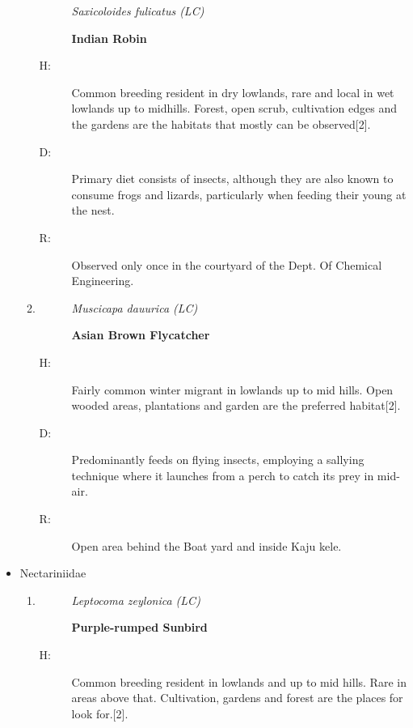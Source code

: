 \begin{itemize}
\begin{enumerate}
\begin{description}%
\item[]%
\textit{Saxicoloides fulicatus (LC)}%
\item[]%
\textbf{Indian Robin}%
\end{description}%
\begin{description}%
\item[H: ]%
Common breeding resident in dry lowlands, rare and local in wet lowlands up to midhills. Forest, open scrub, cultivation edges and the gardens are the habitats that mostly can be observed{[}2{]}.%
\item[D: ]%
Primary diet consists of insects, although they are also known to consume frogs and lizards, particularly when feeding their young at the nest.%
\item[R: ]%
Observed only once in the courtyard of the Dept. Of Chemical Engineering.%
\end{description}%
\item%
\begin{description}%
\item[]%
\textit{Muscicapa dauurica (LC)}%
\item[]%
\textbf{Asian Brown Flycatcher}%
\end{description}%
\begin{description}%
\item[H: ]%
Fairly common winter migrant in lowlands up to mid hills. Open wooded areas, plantations and garden are the preferred habitat{[}2{]}.%
\item[D: ]%
Predominantly feeds on flying insects, employing a sallying technique where it launches from a perch to catch its prey in mid{-}air.%
\item[R: ]%
Open area behind the Boat yard and inside Kaju kele.%
\end{description}%
\end{enumerate}%
\item%
Nectariniidae%
\begin{enumerate}%
\item%
\begin{description}%
\item[]%
\textit{Leptocoma zeylonica (LC)}%
\item[]%
\textbf{Purple{-}rumped Sunbird}%
\end{description}%
\begin{description}%
\item[H: ]%
Common breeding resident in lowlands and up to mid hills. Rare in areas above that. Cultivation, gardens and forest are the places for look for.{[}2{]}.%

\end{description}
\end{enumerate}
\end{itemize}

